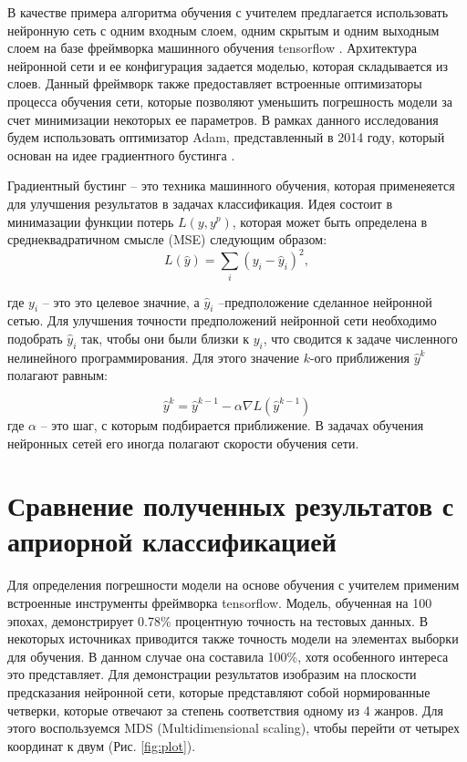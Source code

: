 В качестве примера алгоритма обучения с учителем предлагается использовать нейронную сеть с одним входным слоем, одним скрытым и одним выходным слоем на базе фреймворка машинного обучения tensorflow \cite{tensorflow}.
Архитектура нейронной сети и ее конфигурация задается моделью, которая складывается из слоев. 
Данный фреймворк также предоставляет встроенные оптимизаторы процесса обучения сети, которые позволяют уменьшить погрешность модели за счет минимизации некоторых ее параметров. В рамках данного исследования будем использовать оптимизатор Adam, представленный в 2014 году, который основан на идее градиентного бустинга \cite{adam}.

Градиентный бустинг -- это техника машинного обучения, которая применеяется для улучшения результатов в задачах классификация. Идея состоит в минимазации функции потерь $L(y, y^p)$, которая может быть определена в среднеквадратичном смысле (MSE) следующим образом:
\begin{equation}
	L(\hat y) = \sum_{i} (y_i - \hat y _i)^2,
\end{equation} 

где $y_i$ -- это это целевое значние, а $\hat y_i$ --предположение сделанное нейронной сетью.
Для улучшения точности предположений нейронной сети необходимо подобрать $\hat y_i$ так, чтобы они были близки к $y_i$, что сводится к задаче численного нелинейного программирования.
Для этого значение $k$-ого приближения $\hat y^k$ полагают равным:

\begin{equation}
	\hat y^k =\hat y^{k-1} - \alpha \nabla L(\hat y^{k-1})
\end{equation}
где $\alpha$ -- это шаг, с которым подбирается приближение. В задачах обучения нейронных сетей его иногда полагают скорости обучения сети.


\chapter{Сравнение полученных результатов с априорной классификацией}

Для определения погрешности модели на основе обучения с учителем применим встроенные инструменты фреймворка tensorflow.
Модель, обученная на 100 эпохах, демонстрирует 0.78\% процентную точность на тестовых данных. В некоторых источниках приводится также точность модели на элементах выборки для обучения. В данном случае она составила 100\%, хотя особенного интереса это представляет.
Для демонстрации результатов изобразим на плоскости предсказания нейронной сети, которые представляют собой нормированные четверки, которые отвечают за степень соответствия одному из 4 жанров. Для этого
воспользуемся MDS (Multidimensional scaling), чтобы перейти от четырех координат к двум (Рис. \ref{fig:plot}).

